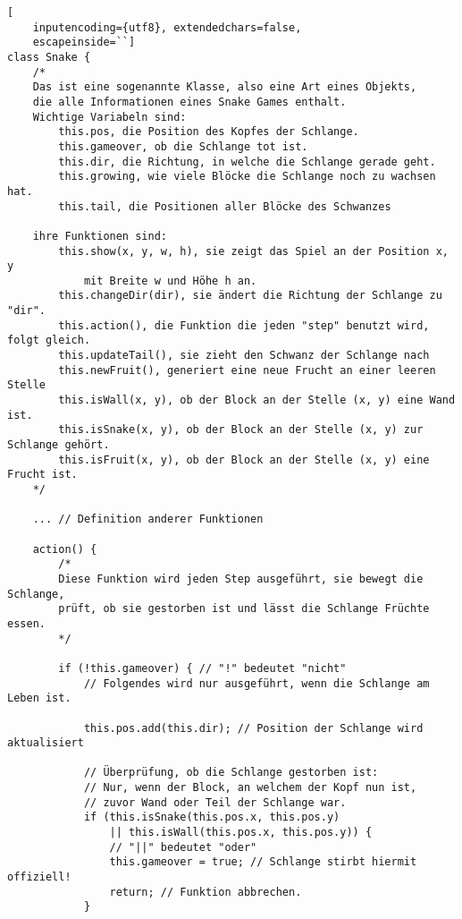 \documentclass[10pt,a4paper,ngerman,english]{article}
\begin{document}
\begin{lstlisting}[
    inputencoding={utf8}, extendedchars=false,  
    escapeinside=``]
class Snake { 
    /* 
    Das ist eine sogenannte Klasse, also eine Art eines Objekts,
    die alle Informationen eines Snake Games enthalt. 
    Wichtige Variabeln sind:
        this.pos, die Position des Kopfes der Schlange.
        this.gameover, ob die Schlange tot ist.
        this.dir, die Richtung, in welche die Schlange gerade geht.
        this.growing, wie viele Blöcke die Schlange noch zu wachsen hat.
        this.tail, die Positionen aller Blöcke des Schwanzes

    ihre Funktionen sind:
        this.show(x, y, w, h), sie zeigt das Spiel an der Position x, y 
            mit Breite w und Höhe h an.
        this.changeDir(dir), sie ändert die Richtung der Schlange zu "dir".
        this.action(), die Funktion die jeden "step" benutzt wird, folgt gleich.
        this.updateTail(), sie zieht den Schwanz der Schlange nach
        this.newFruit(), generiert eine neue Frucht an einer leeren Stelle
        this.isWall(x, y), ob der Block an der Stelle (x, y) eine Wand ist.
        this.isSnake(x, y), ob der Block an der Stelle (x, y) zur Schlange gehört.
        this.isFruit(x, y), ob der Block an der Stelle (x, y) eine Frucht ist.
    */

    ... // Definition anderer Funktionen

    action() {
        /*
        Diese Funktion wird jeden Step ausgeführt, sie bewegt die Schlange, 
        prüft, ob sie gestorben ist und lässt die Schlange Früchte essen.
        */

        if (!this.gameover) { // "!" bedeutet "nicht"
            // Folgendes wird nur ausgeführt, wenn die Schlange am Leben ist.

            this.pos.add(this.dir); // Position der Schlange wird aktualisiert

            // Überprüfung, ob die Schlange gestorben ist:
            // Nur, wenn der Block, an welchem der Kopf nun ist, 
            // zuvor Wand oder Teil der Schlange war.
            if (this.isSnake(this.pos.x, this.pos.y) 
                || this.isWall(this.pos.x, this.pos.y)) { 
                // "||" bedeutet "oder"
                this.gameover = true; // Schlange stirbt hiermit offiziell!
                return; // Funktion abbrechen.
            }


\end{lstlisting}
\end{document}
